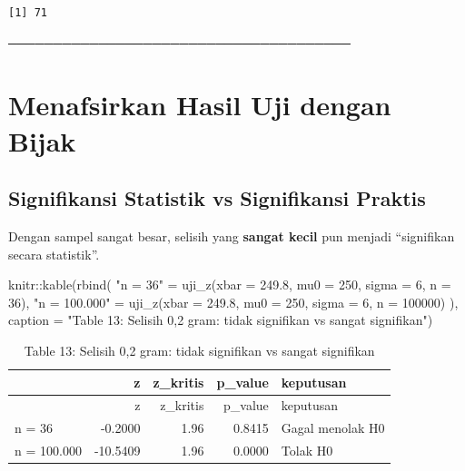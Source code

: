 \documentclass[
  indonesian,
  letterpaper,
]{book}
\newenvironment{Shaded}{\begin{snugshade}}{\end{snugshade}}
\newcommand{\AttributeTok}[1]{\textcolor[rgb]{0.40,0.45,0.13}{#1}}
\newcommand{\DecValTok}[1]{\textcolor[rgb]{0.68,0.00,0.00}{#1}}
\newcommand{\FloatTok}[1]{\textcolor[rgb]{0.68,0.00,0.00}{#1}}
\newcommand{\FunctionTok}[1]{\textcolor[rgb]{0.28,0.35,0.67}{#1}}
\newcommand{\NormalTok}[1]{\textcolor[rgb]{0.00,0.23,0.31}{#1}}
\newcommand{\OtherTok}[1]{\textcolor[rgb]{0.00,0.23,0.31}{#1}}
\newcommand{\SpecialCharTok}[1]{\textcolor[rgb]{0.37,0.37,0.37}{#1}}
\newcommand{\StringTok}[1]{\textcolor[rgb]{0.13,0.47,0.30}{#1}}
\begin{document}
\begin{verbatim}
[1] 71
\end{verbatim}

──────────────────────────────────────

\section{Menafsirkan Hasil Uji dengan
Bijak}\label{menafsirkan-hasil-uji-dengan-bijak}

\subsection{Signifikansi Statistik vs Signifikansi
Praktis}\label{signifikansi-statistik-vs-signifikansi-praktis}

Dengan sampel sangat besar, selisih yang \textbf{sangat kecil} pun
menjadi ``signifikan secara statistik''.

\begin{Shaded}
\begin{Highlighting}[]
\NormalTok{knitr}\SpecialCharTok{::}\FunctionTok{kable}\NormalTok{(}\FunctionTok{rbind}\NormalTok{(}
\StringTok{"n = 36"} \OtherTok{=} \FunctionTok{uji\_z}\NormalTok{(}\AttributeTok{xbar =} \FloatTok{249.8}\NormalTok{, }\AttributeTok{mu0 =} \DecValTok{250}\NormalTok{, }\AttributeTok{sigma =} \DecValTok{6}\NormalTok{, }\AttributeTok{n =} \DecValTok{36}\NormalTok{),}
\StringTok{"n = 100.000"} \OtherTok{=} \FunctionTok{uji\_z}\NormalTok{(}\AttributeTok{xbar =} \FloatTok{249.8}\NormalTok{, }\AttributeTok{mu0 =} \DecValTok{250}\NormalTok{, }\AttributeTok{sigma =} \DecValTok{6}\NormalTok{, }\AttributeTok{n =} \DecValTok{100000}\NormalTok{)}
\NormalTok{), }\AttributeTok{caption =} \StringTok{"Table 13: Selisih 0,2 gram: tidak signifikan vs sangat signifikan"}\NormalTok{)}
\end{Highlighting}
\end{Shaded}

\begin{longtable}[]{@{}lrrrl@{}}
\caption{Table 13: Selisih 0,2 gram: tidak signifikan vs sangat
signifikan}\tabularnewline
\toprule\noalign{}
& z & z\_kritis & p\_value & keputusan \\
\midrule\noalign{}
\endfirsthead
\toprule\noalign{}
& z & z\_kritis & p\_value & keputusan \\
\midrule\noalign{}
\endhead
\bottomrule\noalign{}
\endlastfoot
n = 36 & -0.2000 & 1.96 & 0.8415 & Gagal menolak H0 \\
n = 100.000 & -10.5409 & 1.96 & 0.0000 & Tolak H0 \\
\end{longtable}
\end{document}

